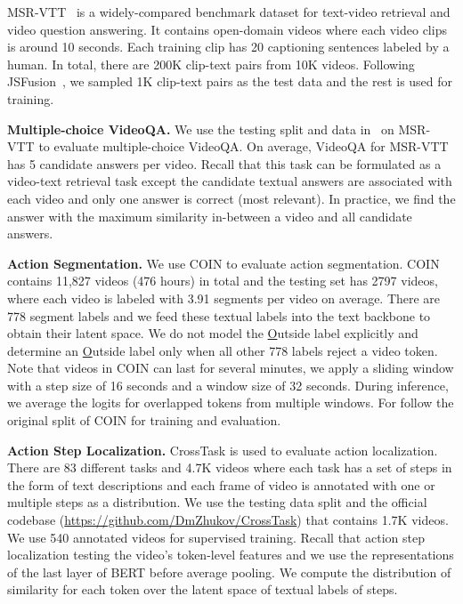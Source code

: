 \documentclass[11pt]{article}
\begin{document}
MSR-VTT~\cite{xu2016msr} is a widely-compared benchmark dataset for text-video retrieval and video question answering.
It contains open-domain videos where each video clips is around 10 seconds. Each training clip has 20 captioning sentences labeled by a human. 
In total, there are 200K clip-text pairs from 10K videos.
Following JSFusion~\cite{yu2018joint,miech2019howto100m}, we sampled 1K clip-text pairs as the test data and the rest is used for training.


\noindent \textbf{Multiple-choice VideoQA.} We use the testing split and data in~\cite{yu2018joint} on MSR-VTT to evaluate multiple-choice VideoQA.
On average, VideoQA for MSR-VTT has 5 candidate answers per video.
Recall that this task can be formulated as a video-text retrieval task except the candidate textual answers are associated with each video and only one answer is correct (most relevant).
In practice, we find the answer with the maximum similarity in-between a video and all candidate answers.





\noindent \textbf{Action Segmentation.} 
We use COIN \cite{tang2019coin} to evaluate action segmentation.
COIN contains 11,827 videos (476 hours) in total and the testing set has 2797 videos, where each video is labeled with 3.91 segments per video on average.
There are 778 segment labels and we feed these textual labels into the text backbone to obtain their latent space.
We do not model the \underline{O}utside label explicitly and determine an \underline{O}utside label only when all other 778 labels reject a video token. 
Note that videos in COIN can last for several minutes, we apply a sliding window with a step size of 16 seconds and a window size of 32 seconds.
During inference, we average the logits for overlapped tokens from multiple windows.
For follow the original split of COIN for training and evaluation.

\noindent \textbf{Action Step Localization.} CrossTask \cite{zhukov2019cross} is used to evaluate action localization. 
There are 83 different tasks and 4.7K videos where each task has a set of steps in the form of text descriptions and each frame of video is annotated with one or multiple steps as a distribution.
We use the testing data split and the official codebase (\url{https://github.com/DmZhukov/CrossTask}) that contains 1.7K videos.
We use 540 annotated videos for supervised training.
Recall that action step localization testing the video's token-level features and we use the representations  of the last layer of BERT before average pooling.
We compute the distribution of similarity for each token over the latent space of textual labels of steps.
\end{document}
